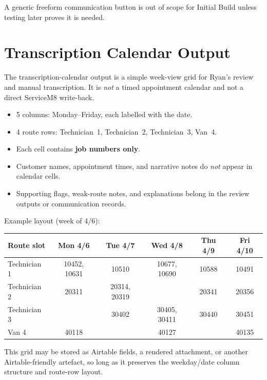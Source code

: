\documentclass[12pt]{article}
\begin{document}
A generic freeform communication button is out of scope for Initial Build unless testing later proves it is needed.

\section*{Transcription Calendar Output}
\label{sec:transcription}

The transcription-calendar output is a simple week-view grid for Ryan's review and manual transcription.
It is \emph{not} a timed appointment calendar and not a direct ServiceM8 write-back.

\begin{itemize}
    \item 5 columns: Monday--Friday, each labelled with the date.
    \item 4 route rows: Technician~1, Technician~2, Technician~3, Van~4.
    \item Each cell contains \textbf{job numbers only}.
    \item Customer names, appointment times, and narrative notes do \emph{not} appear in calendar cells.
    \item Supporting flags, weak-route notes, and explanations belong in the review outputs or communication records.
\end{itemize}

Example layout (week of 4/6):

\medskip
{\small
\begin{longtable}{lccccc}
\toprule
\textbf{Route slot} & \textbf{Mon 4/6} & \textbf{Tue 4/7} & \textbf{Wed 4/8} & \textbf{Thu 4/9} & \textbf{Fri 4/10} \\
\midrule
Technician 1 & 10452, 10631 & 10510 & 10677, 10690 & 10588 & 10491 \\
Technician 2 & 20311 & 20314, 20319 & & 20341 & 20356 \\
Technician 3 & & 30402 & 30405, 30411 & 30440 & 30451 \\
Van 4        & 40118 & & 40127 & & 40135 \\
\bottomrule
\end{longtable}
}

This grid may be stored as Airtable fields, a rendered attachment, or another Airtable-friendly artefact, so long as it preserves the weekday/date column structure and route-row layout.
\end{document}
